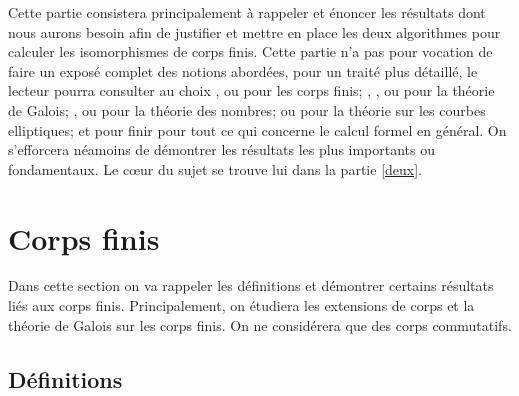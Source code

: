 \documentclass[a4paper]{article} %
\numberwithin{section}{part}
\numberwithin{equation}{section}
\begin{document}
Cette partie consistera principalement à rappeler et énoncer les résultats dont
nous aurons besoin afin de justifier et mettre en place les deux algorithmes 
pour calculer les isomorphismes de corps finis. Cette partie n'a pas pour 
vocation de faire un exposé complet des notions abordées, pour un traité plus 
détaillé, le lecteur pourra consulter au choix \cite{LiNi1}, \cite{MuPa} ou 
\cite[chap.~III]{Per} pour les corps finis; \cite{Nek}, \cite[chap.~VIII]{Pol},
\cite[chap. VI]{Sam} ou \cite{Esc} pour la théorie de Galois; \cite{Sam}, 
\cite{Was1} ou \cite{Lan} pour la théorie des nombres; \cite{Sil} ou 
\cite{Was2} pour la théorie sur les courbes elliptiques; et pour finir 
\cite{GaGe} pour tout ce qui concerne le calcul formel en général. On 
s'efforcera néamoins de démontrer les résultats les plus importants ou 
fondamentaux. Le c\oe ur du sujet se trouve lui dans la partie \ref{deux}.

\section{Corps finis}
Dans cette section on va rappeler les définitions et démontrer certains 
résultats liés aux corps finis. Principalement, on étudiera les extensions 
de corps et la théorie de Galois sur les corps finis. On ne considérera
que des corps commutatifs.

\subsection{Définitions}
\end{document}
